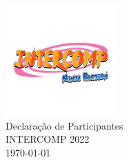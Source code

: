 \begin{center}

	\vspace*{\fill}
	{\let\clearpage\relax \includegraphics[width=120pt]{../logo-ninja-edition.jpg} \\ [.5cm]}
	\Huge{Declaração de Participantes} \\ [.5cm]
	\Large{INTERCOMP 2022} \\ [.5cm]
	\normalsize{\today}
	\vspace*{\fill}

\end{center}
